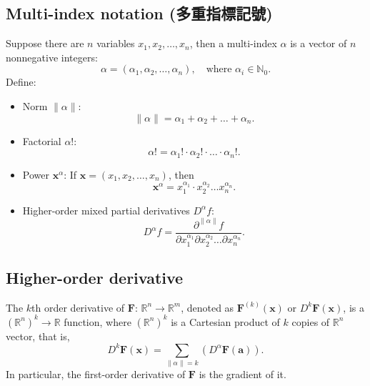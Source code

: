 \documentclass[a4paper,12pt]{report}
\begin{document}
{{{{{{{{{{{{\subsection{Multi-index notation (多重指標記號)}
Suppose there are \( n \) variables \( x_1, x_2, \dots, x_n \), then a multi-index $\alpha$ is a vector of \( n \) nonnegative integers: 
\[
\alpha = (\alpha_1, \alpha_2, \dots, \alpha_n), \quad \text{where } \alpha_i \in \mathbb{N}_0.
\]
Define: 
\begin{itemize}
\item Norm \( \|\alpha\| \): 
\[
\|\alpha\| = \alpha_1 + \alpha_2 + \dots  + \alpha_n.
\]
\item Factorial \( \alpha! \): 
\[
\alpha! = \alpha_1! \cdot \alpha_2! \cdot \dots  \cdot \alpha_n!.
\]
\item Power \( \mathbf{x}^\alpha \): 
If \( \mathbf{x} = (x_1, x_2, \dots, x_n) \), then
\[
\mathbf{x}^\alpha = x_1^{\alpha_1} \cdot x_2^{\alpha_2} \dots  x_n^{\alpha_n}.
\]
\item Higher-order mixed partial derivatives $D^\alpha f$: 
\[
D^\alpha f = \frac{\partial^{\|\alpha\|} f}{\partial x_1^{\alpha_1} \partial x_2^{\alpha_2} \dots  \partial x_n^{\alpha_n}}.
\]
\end{itemize}
\subsection{Higher-order derivative}
The $k$th order derivative of $\mathbf{F}:\,\mathbb{R}^n\to\mathbb{R}^m$, denoted as $\mathbf{F}^{(k)}(\mathbf{x})$ or $D^{k}\mathbf{F}(\mathbf{x})$, is a $(\mathbb{R}^n)^k\to\mathbb{R}$ function, where $(\mathbb{R}^n)^k$ is a Cartesian product of $k$ copies of $\mathbb{R}^n$ vector, that is,
\[D^{k}\mathbf{F}(\mathbf{x})=\sum_{\|\alpha\|=k} \left(D^\alpha \mathbf{F}(\mathbf{a})\right).\]
In particular, the first-order derivative of $\mathbf{F}$ is the gradient of it.
}}}}}}}}}}}}
\end{document}
